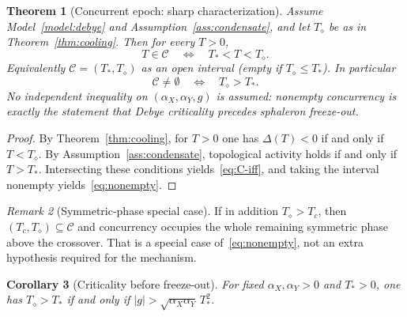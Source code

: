 \documentclass[11pt]{article}
\newtheorem{theorem}{Theorem}[section]
\newtheorem{corollary}[theorem]{Corollary}
\theoremstyle{definition}
\theoremstyle{remark}
\newtheorem{remark}[theorem]{Remark}
\newcommand{\Td}{T_{\diamond}}
\begin{document}
\begin{theorem}[Concurrent epoch: sharp characterization]
\label{thm:overlap}
Assume Model~\ref{model:debye} and Assumption~\ref{ass:condensate}, and let
$\Td$ be as in Theorem~\ref{thm:cooling}.
Then for every $T>0$,
\begin{equation}
\label{eq:C-iff}
\boxed{T\in\mathcal C\quad\Longleftrightarrow\quad T_*<T<\Td.}
\end{equation}
Equivalently $\mathcal C=(T_*,\Td)$ as an open interval (empty if $\Td\le T_*$).
In particular
\begin{equation}
\label{eq:nonempty}
\boxed{\mathcal C\neq\emptyset\quad\Longleftrightarrow\quad\Td>T_*.}
\end{equation}
No independent inequality on $(\alpha_X,\alpha_Y,g)$ is assumed: nonempty
concurrency is exactly the statement that Debye criticality precedes sphaleron
freeze-out.
\end{theorem}

\begin{proof}
By Theorem~\ref{thm:cooling}, for $T>0$ one has $\Delta(T)<0$ if and only if
$T<\Td$.
By Assumption~\ref{ass:condensate}, topological activity holds if and only if
$T>T_*$.
Intersecting these conditions yields~\eqref{eq:C-iff}, and taking the interval
nonempty yields~\eqref{eq:nonempty}.
\end{proof}

\begin{remark}[Symmetric-phase special case]
\label{rem:symmetric}
If in addition $\Td>T_c$, then $(T_c,\Td)\subseteq\mathcal C$ and concurrency
occupies the whole remaining symmetric phase above the crossover.
That is a special case of~\eqref{eq:nonempty}, not an extra hypothesis required
for the mechanism.
\end{remark}

\begin{corollary}[Criticality before freeze-out]
\label{cor:open-half}
For fixed $\alpha_X,\alpha_Y>0$ and $T_*>0$, one has $\Td>T_*$ if and only if
$|g|>\sqrt{\alpha_X\alpha_Y}\,T_*^{2}$.
\end{corollary}
\end{document}
